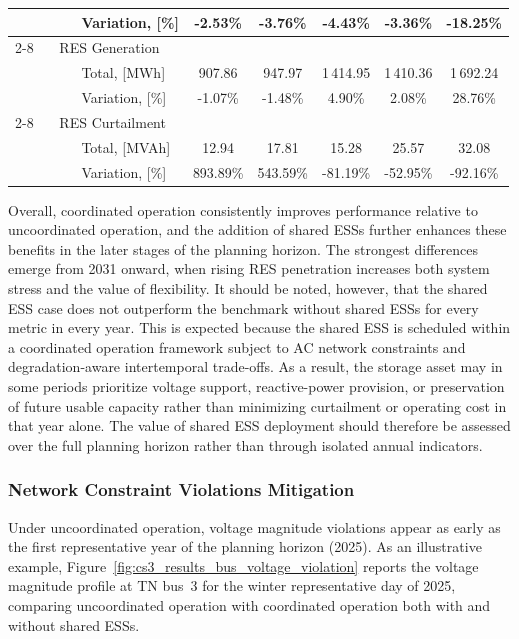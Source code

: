 \documentclass[preprint,12pt]{elsarticle}
\begin{document}
\begin{table}[htbp!]
{\begin{tabular}{lll ccccc}
            ~ & ~ & Variation, [\%] & -2.53\% & -3.76\% & -4.43\% & -3.36\% & -18.25\%\\ \cmidrule{2-8}
            ~ & \multicolumn{2}{l}{RES Generation}\\       
            ~ & ~ & Total, [MWh]    & 907.86 & 947.97 & 1\,414.95 & 1\,410.36 & 1\,692.24\\
            ~ & ~ & Variation, [\%] & -1.07\% & -1.48\% & 4.90\% & 2.08\% & 28.76\%\\ \cmidrule{2-8}
            ~ & \multicolumn{2}{l}{RES Curtailment}\\       
            ~ & ~ & Total, [MVAh]   & 12.94 & 17.81 & 15.28 & 25.57 & 32.08\\
            ~ & ~ & Variation, [\%] & 893.89\% & 543.59\% & -81.19\% & -52.95\% & -92.16\%\\
            \bottomrule
        \end{tabular}
    }
    \label{tab:cs3_results_operational_planning_summary}
\end{table}

Overall, coordinated operation consistently improves performance relative to uncoordinated operation, and the addition of shared ESSs further enhances these benefits in the later stages of the planning horizon. The strongest differences emerge from 2031 onward, when rising RES penetration increases both system stress and the value of flexibility.
It should be noted, however, that the shared ESS case does not outperform the benchmark without shared ESSs for every metric in every year. This is expected because the shared ESS is scheduled within a coordinated operation framework subject to AC network constraints and degradation-aware intertemporal trade-offs. As a result, the storage asset may in some periods prioritize voltage support, reactive-power provision, or preservation of future usable capacity rather than minimizing curtailment or operating cost in that year alone. The value of shared ESS deployment should therefore be assessed over the full planning horizon rather than through isolated annual indicators.

\subsubsection{Network Constraint Violations Mitigation}
\label{subsubsec:network_violations}

Under uncoordinated operation, voltage magnitude violations appear as early as the first representative year of the planning horizon (2025). As an illustrative example, Figure~\ref{fig:cs3_results_bus_voltage_violation} reports the voltage magnitude profile at TN bus~3 for the winter representative day of 2025, comparing uncoordinated operation with coordinated operation both with and without shared ESSs.
\end{document}
